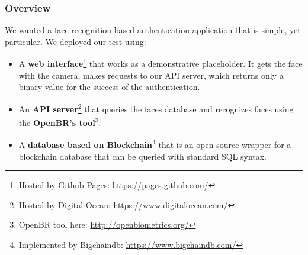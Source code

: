 \begin{frame} \frametitle{Overview}
We wanted a face recognition based authentication application that is simple, 
yet particular. We deployed our test using:

\begin{itemize}

	\item A \textbf{web interface}\footnote{Hosted by Github Pages: 
	{\color{red}\url{https://pages.github.com/}}} that works as a 
	demonstrative placeholder. It gets the face with the camera, makes 
	requests to our API server, which returns only a binary value for the 
	success of the authentication.
	
	\item An \textbf{API server}\footnote{Hosted by Digital Ocean: 
	{\color{red} \url{https://www.digitalocean.com/}}} that queries the 
	faces database and recognizes faces using the \textbf{OpenBR's 
	tool}\footnote{OpenBR tool here: {\color{red} 
	\url{http://openbiometrics.org/}}}.
	
	\item A \textbf{database based on Blockchain}\footnote{Implemented by 
	Bigchaindb: {\color{red} \url{https://www.bigchaindb.com/}}} that is an
	open source wrapper for a blockchain database that can be queried with 
	standard SQL syntax.
	
\end{itemize}
\end{frame}

